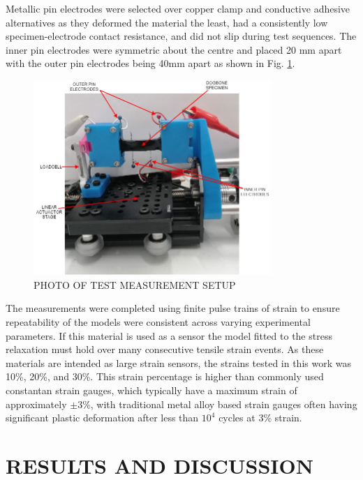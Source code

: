 Metallic pin electrodes were selected over copper clamp and conductive adhesive alternatives as they deformed the material the least, had a consistently low specimen-electrode contact resistance, and did not slip during test sequences. The inner pin electrodes were symmetric about the centre and placed 20 mm apart with the outer pin electrodes being 40mm apart as shown in Fig. \ref{fig:electromech-setup}.
\begin{figure}[H]
    \centering
    \includegraphics[width=9cm]{Figures/ELECTROMECH-SETUP.png}
    \caption{PHOTO OF TEST MEASUREMENT SETUP}
    \label{fig:electromech-setup}
\end{figure}
The measurements were completed using finite pulse trains of strain to ensure repeatability of the models were consistent across varying experimental parameters. If this material is used as a sensor the model fitted to the stress relaxation must hold over many consecutive tensile strain events. As these materials are intended as large strain sensors, the strains tested in this work was 10\%, 20\%, and 30\%. This strain percentage is higher than commonly used constantan strain gauges, which typically have a maximum strain of approximately $\pm 3$\%\cite{VishayPG2018}, with traditional metal alloy based strain gauges often having significant plastic deformation after less than $10^4$ cycles\cite{VishayPG2018} at 3\% strain.



\section*{RESULTS AND DISCUSSION}


